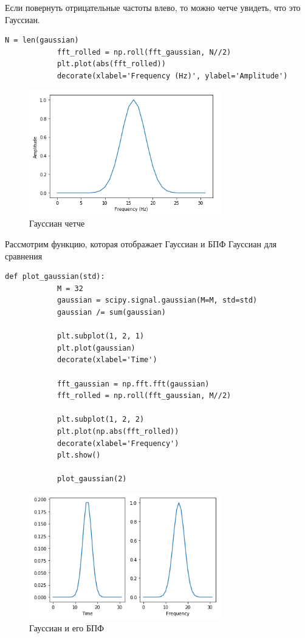 \documentclass[a4paper,12pt]{article}
\begin{document}
\begin{enumerate}
		Если повернуть отрицательные частоты влево, то можно четче увидеть, что это Гауссиан.
		\begin{lstlisting}[caption=Построение Гауссиана]
			N = len(gaussian)
			fft_rolled = np.roll(fft_gaussian, N//2)
			plt.plot(abs(fft_rolled))
			decorate(xlabel='Frequency (Hz)', ylabel='Amplitude')
		\end{lstlisting}
		\begin{figure}[H]
			\centering
			\includegraphics[width=0.75\textwidth]{2_3.png}
			\caption{Гауссиан четче}
			\label{fig:2.3}
		\end{figure}
		
		Рассмотрим функцию, которая отображает Гауссиан и БПФ Гауссиан для сравнения
		\begin{lstlisting}[caption=Функция \texttt{plot\_gaussian()}]
			def plot_gaussian(std):
			M = 32
			gaussian = scipy.signal.gaussian(M=M, std=std)
			gaussian /= sum(gaussian)
			
			plt.subplot(1, 2, 1)
			plt.plot(gaussian)
			decorate(xlabel='Time')
			
			fft_gaussian = np.fft.fft(gaussian)
			fft_rolled = np.roll(fft_gaussian, M//2)
			
			plt.subplot(1, 2, 2)
			plt.plot(np.abs(fft_rolled))
			decorate(xlabel='Frequency')
			plt.show()
			
			plot_gaussian(2)
		\end{lstlisting}
		\begin{figure}[H]
			\centering
			\includegraphics[width=0.75\textwidth]{2_4.png}
			\caption{Гауссиан и его БПФ}
			\label{fig:2.4}
		\end{figure}
		

\end{enumerate}
\end{document}
